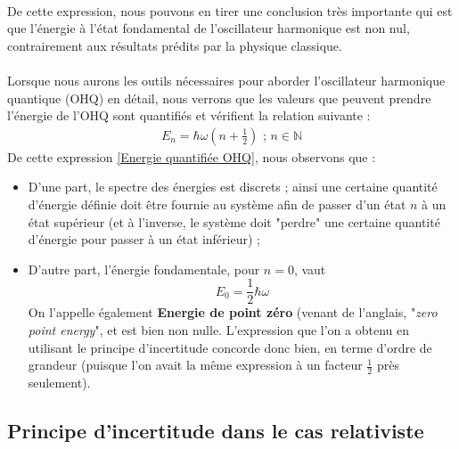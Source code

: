 \documentclass[../Notes de cours]{subfiles}
\begin{document}
\paragraph{} De cette expression, nous pouvons en tirer une conclusion très importante qui est que l'énergie à l'état fondamental de l'oscillateur harmonique est non nul, contrairement aux résultats prédits par la physique classique. 

\paragraph{} Lorsque nous aurons les outils nécessaires pour aborder l'oscillateur harmonique quantique (OHQ) en détail, nous verrons que les valeurs que peuvent prendre l'énergie de l'OHQ sont quantifiés et vérifient la relation suivante :
\begin{align}
\label{Energie quantifiée OHQ}
E_n = \hbar \omega \left( n + \frac{1}{2} \right) \mbox{ ; $n \in \mathbb{N} $}
\end{align}
De cette expression \ref{Energie quantifiée OHQ}, nous observons que : 
\begin{itemize}[label=\textbullet]
    \item D'une part, le spectre des énergies est discrets ; ainsi une certaine quantité d'énergie définie doit être fournie au système afin de passer d'un état $n$ à un état supérieur (et à l'inverse, le système doit "perdre" une certaine quantité d'énergie pour passer à un état inférieur) ; 
    \item D'autre part, l'énergie fondamentale, pour $n=0$, vaut $$ E_0 = \frac{1}{2} \hbar \omega $$
    On l'appelle également \textbf{Energie de point zéro} (venant de l'anglais, "\textit{zero point energy}", et est bien non nulle. 
    \newline L'expression que l'on a obtenu en utilisant le principe d'incertitude concorde donc bien, en terme d'ordre de grandeur (puisque l'on avait la même expression à un facteur $\frac{1}{2}$ près seulement). 
\end{itemize} 

\subsection{Principe d'incertitude dans le cas relativiste}
\end{document}
